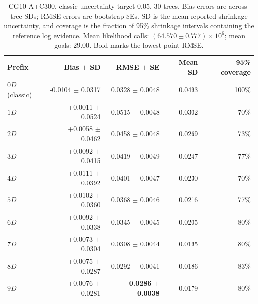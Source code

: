 \begin{table}[t]
\centering
\scriptsize
\caption{CG10 A+C300, classic uncertainty target 0.05, 30 trees. Bias errors are across-tree SDs; RMSE errors are bootstrap SEs. SD is the mean reported shrinkage uncertainty, and coverage is the fraction of 95\% shrinkage intervals containing the reference log evidence. Mean likelihood calls: $(64.570\pm0.777)\times10^6$; mean goals: $29.00$. Bold marks the lowest point RMSE.}
\label{tab:phantom_evidence_cg10_0p05}
\begin{tabular}{lrrrr}
\toprule
Prefix & Bias $\pm$ SD & RMSE $\pm$ SE & Mean SD & 95\% coverage \\
\midrule
$0D$ (classic) & -0.0104 $\pm$ 0.0317 & 0.0328 $\pm$ 0.0048 & 0.0493 & 100\% \\
$1D$ & +0.0011 $\pm$ 0.0524 & 0.0515 $\pm$ 0.0048 & 0.0302 & 70\% \\
$2D$ & +0.0058 $\pm$ 0.0462 & 0.0458 $\pm$ 0.0048 & 0.0269 & 73\% \\
$3D$ & +0.0092 $\pm$ 0.0415 & 0.0419 $\pm$ 0.0049 & 0.0247 & 77\% \\
$4D$ & +0.0111 $\pm$ 0.0392 & 0.0401 $\pm$ 0.0047 & 0.0230 & 70\% \\
$5D$ & +0.0102 $\pm$ 0.0360 & 0.0368 $\pm$ 0.0046 & 0.0216 & 77\% \\
$6D$ & +0.0092 $\pm$ 0.0338 & 0.0345 $\pm$ 0.0045 & 0.0205 & 80\% \\
$7D$ & +0.0073 $\pm$ 0.0304 & 0.0308 $\pm$ 0.0044 & 0.0195 & 80\% \\
$8D$ & +0.0075 $\pm$ 0.0287 & 0.0292 $\pm$ 0.0041 & 0.0186 & 83\% \\
$9D$ & +0.0076 $\pm$ 0.0281 & \textbf{0.0286 $\pm$ 0.0038} & 0.0179 & 80\% \\
\bottomrule
\end{tabular}
\end{table}

